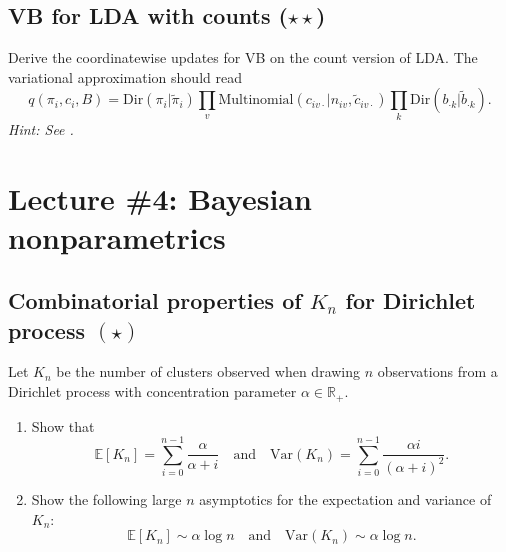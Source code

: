 \documentclass{article}
\newif\ifsolutions
\newcommand\solution[1]{
\ifsolutions
\begin{mdframed}[style=MyFrame]
\textcolor{bleu}{\textbf{Solution:} #1}
\end{mdframed}
\fi
}
\begin{document}
\subsection{VB for LDA with counts ($\star\star$)}
Derive the coordinatewise updates for VB on the count version of LDA. The variational approximation should read
$$
q(\pi_i, c_i, B) = \text{Dir}(\pi_i\vert\tilde\pi_i) \prod_v \text{Multinomial}(c_{iv\cdot}\vert n_{iv}, \tilde{c}_{iv\cdot}) \prod_k \text{Dir}(b_{\cdot k}\vert\tilde b_{\cdot k}).
$$
\emph{Hint: See \cite[Section 27.3.6]{Mur12}.}

\section{Lecture \#4: Bayesian nonparametrics}

\subsection{Combinatorial properties of $K_n$ for Dirichlet process $(\star)$}
\label{ex:K_n-DP}
Let $K_n$ be the number of clusters observed when drawing $n$ observations from a Dirichlet process with concentration parameter $\alpha\in\mathbb{R}_+$.

\begin{enumerate}
	\item Show that
\begin{equation*}
    \mathbb{E}[K_{n}] = \sum_{i=0}^{n-1} \frac{\alpha}{\alpha + i} \quad \text{and} \quad \mbox{Var}(K_n) = \sum_{i=0}^{n-1} \frac{\alpha i}{(\alpha + i)^2}.
\end{equation*}
	\item Show the following large $n$ asymptotics for the expectation and variance of $K_n$:
\begin{equation*}
        \mathbb{E}[K_n] \sim \alpha\log n  \quad \text{and} \quad \mbox{Var}(K_n)\sim \alpha\log n.
\end{equation*}
\end{enumerate}

\solution{
\begin{enumerate}
	\item The expressions are obtained by writing $K_n$ as a sum of independent Bernoulli random variables of parameter $\frac{\alpha}{\alpha+i}$, for $i=0,\ldots, n-1$, due to the DP predictive distribution.
	\item This is obtained by factorizing by $\alpha$ and by Riemann sums of the intergal of $x\mapsto 1/x$ over interval $[1,n]$.
\end{enumerate}
}
\end{document}
